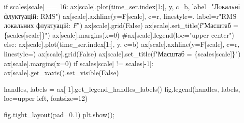 \documentclass[
  letterpaper,
]{report}
\newenvironment{Shaded}{\begin{snugshade}}{\end{snugshade}}
\newcommand{\CommentTok}[1]{\textcolor[rgb]{0.37,0.37,0.37}{#1}}
\newcommand{\ControlFlowTok}[1]{\textcolor[rgb]{0.00,0.23,0.31}{#1}}
\newcommand{\DecValTok}[1]{\textcolor[rgb]{0.68,0.00,0.00}{#1}}
\newcommand{\FloatTok}[1]{\textcolor[rgb]{0.68,0.00,0.00}{#1}}
\newcommand{\NormalTok}[1]{\textcolor[rgb]{0.00,0.23,0.31}{#1}}
\newcommand{\OperatorTok}[1]{\textcolor[rgb]{0.37,0.37,0.37}{#1}}
\newcommand{\SpecialCharTok}[1]{\textcolor[rgb]{0.37,0.37,0.37}{#1}}
\newcommand{\SpecialStringTok}[1]{\textcolor[rgb]{0.13,0.47,0.30}{#1}}
\newcommand{\StringTok}[1]{\textcolor[rgb]{0.13,0.47,0.30}{#1}}
\newcommand{\VariableTok}[1]{\textcolor[rgb]{0.07,0.07,0.07}{#1}}
\newcommand{\VerbatimStringTok}[1]{\textcolor[rgb]{0.13,0.47,0.30}{#1}}
\begin{document}
\begin{Shaded}
\begin{Highlighting}[]
    \ControlFlowTok{if}\NormalTok{ scales[scale] }\OperatorTok{==} \DecValTok{16}\NormalTok{:}
\NormalTok{        ax[scale].plot(time\_ser.index[}\DecValTok{1}\NormalTok{:], y, c}\OperatorTok{=}\StringTok{\textquotesingle{}b\textquotesingle{}}\NormalTok{, label}\OperatorTok{=}\StringTok{"Локальні флуктуацій: RMS"}\NormalTok{)}
\NormalTok{        ax[scale].axhline(y}\OperatorTok{=}\NormalTok{F[scale], c}\OperatorTok{=}\StringTok{\textquotesingle{}r\textquotesingle{}}\NormalTok{, linestyle}\OperatorTok{=}\StringTok{\textquotesingle{}{-}\textquotesingle{}}\NormalTok{, label}\OperatorTok{=}\VerbatimStringTok{r"RMS локальних флуктуацій: $F$"}\NormalTok{)}
\NormalTok{        ax[scale].grid(}\VariableTok{False}\NormalTok{)}
\NormalTok{        ax[scale].set\_title(}\SpecialStringTok{f"Масштаб = }\SpecialCharTok{\{}\NormalTok{scales[scale]}\SpecialCharTok{\}}\SpecialStringTok{"}\NormalTok{)}
\NormalTok{        ax[scale].margins(x}\OperatorTok{=}\DecValTok{0}\NormalTok{)}
        \CommentTok{\#ax[scale].legend(loc="upper center")}
    \ControlFlowTok{else}\NormalTok{: }
\NormalTok{        ax[scale].plot(time\_ser.index[}\DecValTok{1}\NormalTok{:], y, c}\OperatorTok{=}\StringTok{\textquotesingle{}b\textquotesingle{}}\NormalTok{)}
\NormalTok{        ax[scale].axhline(y}\OperatorTok{=}\NormalTok{F[scale], c}\OperatorTok{=}\StringTok{\textquotesingle{}r\textquotesingle{}}\NormalTok{, linestyle}\OperatorTok{=}\StringTok{\textquotesingle{}{-}\textquotesingle{}}\NormalTok{)}
\NormalTok{        ax[scale].grid(}\VariableTok{False}\NormalTok{)}
\NormalTok{        ax[scale].set\_title(}\SpecialStringTok{f"Масштаб = }\SpecialCharTok{\{}\NormalTok{scales[scale]}\SpecialCharTok{\}}\SpecialStringTok{"}\NormalTok{)}
\NormalTok{        ax[scale].margins(x}\OperatorTok{=}\DecValTok{0}\NormalTok{)       }
    \ControlFlowTok{if}\NormalTok{ scales[scale] }\OperatorTok{!=}\NormalTok{ scales[}\OperatorTok{{-}}\DecValTok{1}\NormalTok{]: }
\NormalTok{        ax[scale].get\_xaxis().set\_visible(}\VariableTok{False}\NormalTok{)}

\NormalTok{handles, labels }\OperatorTok{=}\NormalTok{ ax[}\OperatorTok{{-}}\DecValTok{1}\NormalTok{].get\_legend\_handles\_labels()}
\NormalTok{fig.legend(handles, labels, loc}\OperatorTok{=}\StringTok{\textquotesingle{}upper left\textquotesingle{}}\NormalTok{, fontsize}\OperatorTok{=}\DecValTok{12}\NormalTok{)}

\NormalTok{fig.tight\_layout(pad}\OperatorTok{=}\FloatTok{0.1}\NormalTok{)}
\NormalTok{plt.show()}\OperatorTok{;}
\end{Highlighting}
\end{Shaded}
\end{document}
